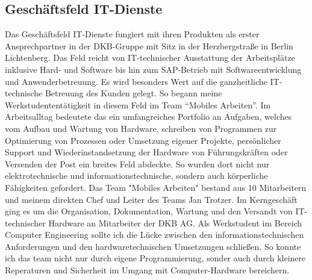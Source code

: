 \subsection{Geschäftsfeld IT-Dienste}\label{einleitung}


Das Geschäftsfeld IT-Dienste fungiert mit ihren Produkten als erster Ansprechpartner in der DKB-Gruppe mit Sitz in der Herzbergstraße in Berlin Lichtenberg. Das Feld reicht von IT-technischer Ausstattung der Arbeitsplätze inklusive Hard- und Software bis hin zum SAP-Betrieb mit Softwareentwicklung und Anwenderbetreuung. Es wird besonders Wert auf die ganzheitliche IT-technische Betreuung des Kunden gelegt. So begann meine Werkstudententätigkeit in diesem Feld im Team “Mobiles Arbeiten”. Im Arbeitsalltag bedeutete das ein umfangreiches Portfolio an Aufgaben, welches vom Aufbau und Wartung von Hardware, schreiben von Programmen zur Optimierung von Prozessen oder Umsetzung eigener Projekte, persönlicher Support und  Wiederinstandsetzung der Hardware von Führungskräften oder Versenden der Post ein breites Feld abdeckte.  So wurden dort nicht nur elektrotechnische und informationstechnische, sondern auch körperliche Fähigkeiten gefordert. Das Team "Mobiles Arbeiten" bestand aus 10 Mitarbeitern und meinem direkten Chef und Leiter des Teams Jan Trotzer. Im Kerngeschäft ging es um die Organisation, Dokumentation, Wartung und den Versandt von IT-technischer Hardware an Mitarbeiter der DKB AG. Als Werkstudent im Bereich Computer Engineering sollte ich die Lücke zwischen den informationstechnischen Anforderungen und den hardwaretechnischen Umsetzungen schließen. So konnte ich das team nicht nur durch eigene Programmierung, sonder auch durch kleinere Reperaturen und Sicherheit im Umgang mit Computer-Hardware bereichern. 

